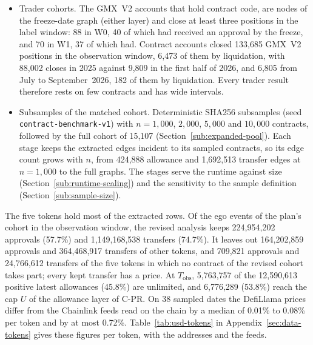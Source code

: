 \begin{itemize}
\item Trader cohorts. The GMX~V2 accounts that hold contract code, are nodes of the freeze-date graph (either layer) and close at least three positions in the label window: 88 in W0, 40 of which had received an approval by the freeze, and 70 in W1, 37 of which had. Contract accounts closed 133,685 GMX~V2 positions in the observation window, 6,473 of them by liquidation, with 88,002 closes in 2025 against 9,809 in the first half of 2026, and 6,805 from July to September~2026, 182 of them by liquidation. Every trader result therefore rests on few contracts and has wide intervals.
\item Subsamples of the matched cohort. Deterministic SHA256 subsamples (seed \texttt{contract-benchmark-v1}) with $n=1{,}000$, $2{,}000$, $5{,}000$ and $10{,}000$ contracts, followed by the full cohort of 15,107 (Section~\ref{sub:expanded-pool}). Each stage keeps the extracted edges incident to its sampled contracts, so its edge count grows with $n$, from 424,888 allowance and 1,692,513 transfer edges at $n=1{,}000$ to the full graphs. The stages serve the runtime against size (Section~\ref{sub:runtime-scaling}) and the sensitivity to the sample definition (Section~\ref{sub:sample-size}).
\end{itemize}

The five tokens hold most of the extracted rows. Of the ego events of the plan's cohort in the observation window, the revised analysis keeps 224,954,202 approvals (57.7\%) and 1,149,168,538 transfers (74.7\%). It leaves out 164,202,859 approvals and 364,468,917 transfers of other tokens, and 709,821 approvals and 24,766,612 transfers of the five tokens in which no contract of the revised cohort takes part; every kept transfer has a price. At $T_{\mathrm{obs}}$, 5,763,757 of the 12,590,613 positive latest allowances (45.8\%) are unlimited, and 6,776,289 (53.8\%) reach the cap $U$ of the allowance layer of C-PR. On 38 sampled dates the DefiLlama prices differ from the Chainlink feeds read on the chain by a median of 0.01\% to 0.08\% per token and by at most 0.72\%. Table~\ref{tab:usd-tokens} in Appendix~\ref{sec:data-tokens} gives these figures per token, with the addresses and the feeds.

